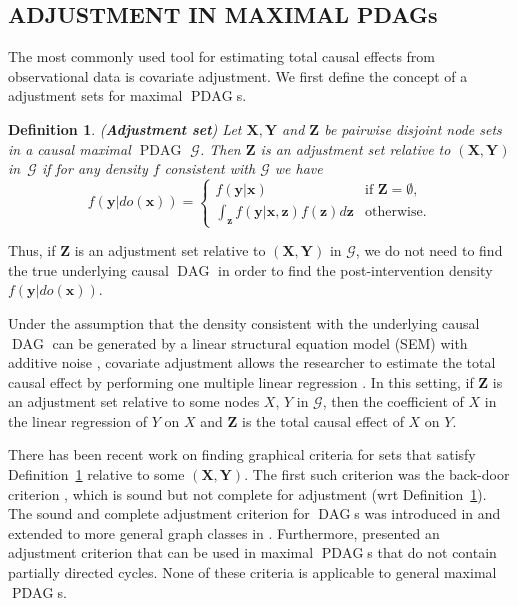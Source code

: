 \documentclass[letterpaper]{article}
\newtheorem{definition}[theorem]{Definition}
\theoremstyle{definition}
\theoremstyle{remark}
\DeclareMathOperator{\PDAG}{PDAG}
\DeclareMathOperator{\DAG}{DAG}
\newcommand{\mpdag}{maximal $\PDAG$}
\newcommand{\MPDAG}{MAXIMAL PDAG}
\newcommand{\g}[1][G]{\mathcal{#1}}
\begin{document}
\subsection{ADJUSTMENT IN \MPDAG{}s} \label{sec:adjust-mpdag}
The most commonly used tool for estimating total causal effects from observational data is covariate adjustment.
We first define the concept of a adjustment sets for \mpdag{}s.
\begin{definition}{(\textbf{Adjustment set})}
   Let $\mathbf{X,Y}$ and $\mathbf{Z}$ be pairwise disjoint node sets in a causal \mpdag{} $\g$. Then $\mathbf{Z}$ is an adjustment set relative to $(\mathbf{X,Y})$ in~$\g$ if for any density $f$ consistent with $\g$ we have
   \begin{equation}
   f(\mathbf{y}|do(\mathbf{x}))=
   \begin{cases}
   f(\mathbf{y}|\mathbf{x}) & \text{if }\mathbf{Z} = \emptyset,\\
   \int_{\mathbf{z}}f(\mathbf{y}|\mathbf{x,z})f(\mathbf{z})d\mathbf{z}  & \text{otherwise.}
   \end{cases}
   \nonumber
   \end{equation}
   \label{defadjustmentmpdag}
\end{definition}\vspace{-0.3cm}
\noindent{}Thus, if $\mathbf{Z}$ is an adjustment set relative to $(\mathbf{X,Y})$ in $\g$, we do not need to find the true underlying causal $\DAG$ in order to find the post-intervention density $f(\mathbf{y}|do(\mathbf{x}))$.

Under the assumption that the density consistent with the underlying causal $\DAG$ can be generated by a linear structural equation model (SEM) with additive noise \citep[see Ch.5 in][for definition of SEMs]{Pearl2009}, covariate adjustment allows the researcher to estimate the total causal effect by performing one multiple linear regression \citep[see][for the non-Gaussian noise result]{nandy2014estimating}. In this setting, if $\mathbf{Z}$ is an adjustment set relative to some nodes $X$, $Y$ in $\g$, then the coefficient of $X$ in the linear regression of $Y$ on $X$ and $\mathbf{Z}$ is the total causal effect of $X$ on $Y$.

There has been recent work on finding graphical criteria for sets that satisfy Definition~\ref{defadjustmentmpdag} relative to some $(\mathbf{X},\mathbf{Y})$. The first such criterion was the back-door criterion \citep{Pearl2009}, which is sound but not complete for adjustment (wrt Definition~\ref{defadjustmentmpdag}). The sound and complete adjustment criterion for $\DAG$s was introduced in \cite{shpitser2012validity,shpitser2012avalidity} and extended to more general graph classes in \cite{perkovic15_uai,perkovic16}. Furthermore, \cite{vanDerZander16} presented an adjustment criterion that can be used in \mpdag{}s that do not contain partially directed cycles. None of these criteria is applicable to general \mpdag{}s.
\end{document}
